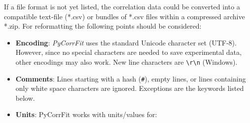 If a file format is not yet listed, the correlation data could be converted into a compatible text-file (*.csv) or bundles of *.csv files within a compressed archive *.zip. For reformatting the following points should be considered:


\begin{itemize}
\item \textbf{Encoding}: \textit{PyCorrFit} uses the standard Unicode character set (UTF-8). However, since no special characters are needed to save experimental data, other encodings may also work. New line characters are \texttt{{\textbackslash}r{\textbackslash}n} (Windows).
\item \textbf{Comments}: Lines starting with a hash (\texttt{\#}), empty lines, or lines containing only white space characters are ignored. Exceptions are the keywords listed below.
\item \textbf{Units}: PyCorrFit works with units/values for:


\end{itemize}
